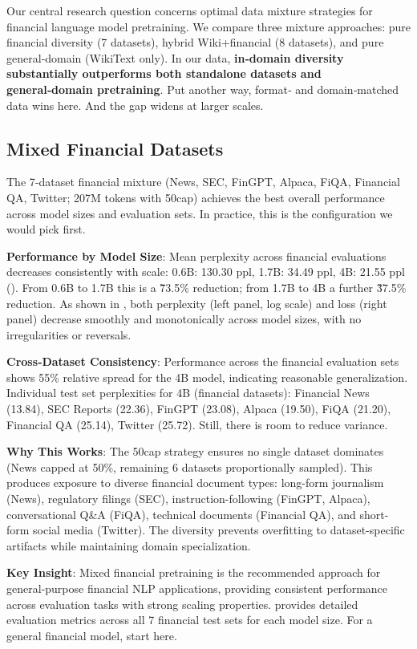 Our central research question concerns optimal data mixture strategies for financial language model pretraining. We compare three mixture approaches: pure financial diversity (7 datasets), hybrid Wiki+financial (8 datasets), and pure general‑domain (WikiText only). In our data, \textbf{in‑domain diversity substantially outperforms both standalone datasets and general‑domain pretraining}. Put another way, format‑ and domain‑matched data wins here. And the gap widens at larger scales.

\subsection{Mixed Financial Datasets}

The 7‑dataset financial mixture (News, SEC, FinGPT, Alpaca, FiQA, Financial QA, Twitter; 207M tokens with 50cap) achieves the best overall performance across model sizes and evaluation sets. In practice, this is the configuration we would pick first.

\textbf{Performance by Model Size}: Mean perplexity across financial evaluations decreases consistently with scale: 0.6B: 130.30 ppl, 1.7B: 34.49 ppl, 4B: 21.55 ppl (). From 0.6B to 1.7B this is a \~73.5\% reduction; from 1.7B to 4B a further \~37.5\% reduction. As shown in , both perplexity (left panel, log scale) and loss (right panel) decrease smoothly and monotonically across model sizes, with no irregularities or reversals.

\textbf{Cross‑Dataset Consistency}: Performance across the financial evaluation sets shows 55\% relative spread for the 4B model, indicating reasonable generalization. Individual test set perplexities for 4B (financial datasets): Financial News (13.84), SEC Reports (22.36), FinGPT (23.08), Alpaca (19.50), FiQA (21.20), Financial QA (25.14), Twitter (25.72). Still, there is room to reduce variance.

\textbf{Why This Works}: The 50cap strategy ensures no single dataset dominates (News capped at 50\%, remaining 6 datasets proportionally sampled). This produces exposure to diverse financial document types: long-form journalism (News), regulatory filings (SEC), instruction-following (FinGPT, Alpaca), conversational Q\&A (FiQA), technical documents (Financial QA), and short-form social media (Twitter). The diversity prevents overfitting to dataset-specific artifacts while maintaining domain specialization.

\textbf{Key Insight}: Mixed financial pretraining is the recommended approach for general‑purpose financial NLP applications, providing consistent performance across evaluation tasks with strong scaling properties.  provides detailed evaluation metrics across all 7 financial test sets for each model size. For a general financial model, start here.

